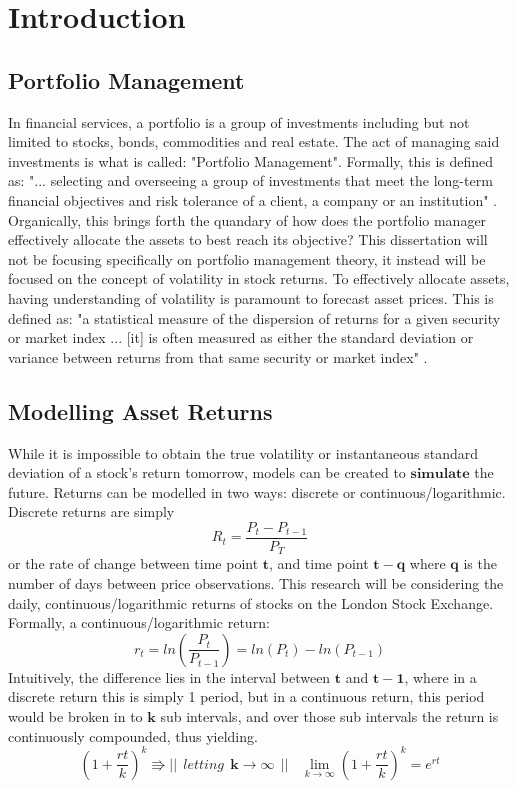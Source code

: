 \chapter{Introduction}

\section{Portfolio Management}

In financial services, a portfolio is a group of investments including but not limited to stocks, bonds, commodities and real estate. The act of managing said investments is what is called: "Portfolio Management". Formally, this is defined as: "... selecting and overseeing a group of investments that meet the long-term financial objectives and risk tolerance of a client, a company or an institution" \cite{hayes_2022}. Organically, this brings forth the quandary of how does the portfolio manager effectively allocate the assets to best reach its objective? This dissertation will not be focusing specifically on portfolio management theory, it instead will be focused on the concept of volatility in stock returns. To effectively allocate assets, having understanding of volatility is paramount to forecast asset prices. This is defined as: "a statistical measure of the dispersion of returns for a given security or market index ...  [it] is often measured as either the standard deviation or variance between returns from that same security or market index" \cite{hayes_2021}. 

\section{Modelling Asset Returns}
While it is impossible to obtain the true volatility or instantaneous standard deviation of a stock's return tomorrow, models can be created to $\mathbf{simulate}$ the future. Returns can be modelled in two ways: discrete or continuous/logarithmic. Discrete returns are simply $$R_t = \frac{P_t-P_{t-1}}{P_T}$$ or the rate of change between time point $\mathbf{t}$, and time point $\mathbf{t-q}$ where $\mathbf{q}$ is the number of days between price observations.  This research will be considering the daily, continuous/logarithmic returns of stocks on the London Stock Exchange. Formally, a continuous/logarithmic return: $$r_t = ln(\frac{P_t}{P_{t-1}}) = ln(P_t)-ln(P_{t-1})$$ Intuitively, the difference lies in the interval between $\mathbf{t}$ and $\mathbf{t-1}$, where in a discrete return this is simply 1 period, but in a continuous return, this period would be broken in to $\mathbf{k}$ sub intervals, and over those sub intervals the return is continuously compounded, thus yielding.  
$$ 
(1+\frac{rt}{k})^k \Rrightarrow 
||~~ letting~~\mathbf{k}\rightarrow \infty~~ ||~~
~~\lim _{k \to \infty}(1+\frac{rt}{k})^k =e^{rt}
$$ \cite{Popov2022}

